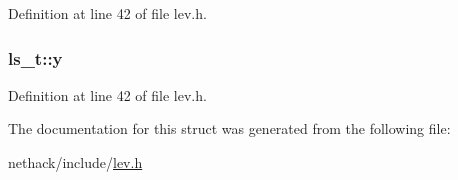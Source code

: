 Definition at line 42 of file lev.\+h.

\hypertarget{structls__t_a7c15bf47a1426b8e59d0fbee6a09529d}{
\subsubsection[{y}]{ ls\+\_\+t\+::y}}\label{structls__t_a7c15bf47a1426b8e59d0fbee6a09529d}


Definition at line 42 of file lev.\+h.



The documentation for this struct was generated from the following file\+:\begin{DoxyCompactItemize}
\item 
nethack/include/\hyperlink{lev_8h}{lev.\+h}\end{DoxyCompactItemize}
